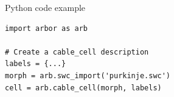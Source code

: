 \documentclass[aspectratio=43]{beamer}
\begin{document}
\begin{frame}[fragile]{Python code example}
    \begin{lstlisting}[style=talkpython]
import arbor as arb

# Create a cable_cell description
labels = {...}
morph = arb.swc_import('purkinje.swc')
cell = arb.cable_cell(morph, labels)
    \end{lstlisting}
\end{frame}

\end{document}
